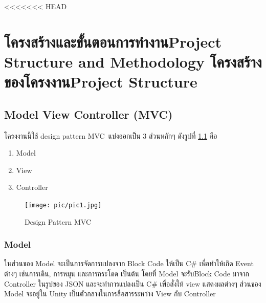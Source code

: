 <<<<<<< HEAD
\chapter{\ifproject%
\ifcpe โครงสร้างและขั้นตอนการทำงาน\else Project Structure and Methodology\fi
\else%
\ifcpe โครงสร้างของโครงงาน\else Project Structure\fi
\fi
}


\makeatletter


\makeatother

\section{Model View Controller (MVC)}
โครงงานนี้ใช้ design pattern MVC~\cite{mvc}แบ่งออกเป็น 3 ส่วนหลักๆ ดังรูปที่ \ref{mvc} คือ 
\begin{enumerate}
    \item Model
    \item View
    \item Controller
\end{enumerate}

\begin{figure}
\begin{center}
\texttt{[image: pic/pic1.jpg]}
\end{center}
\caption[Poem]{Design Pattern MVC}
\label{mvc}
\end{figure}

\subsection{Model}
 ในส่วนของ Model จะเป็นการจัดการแปลงจาก Block Code ให้เป็น C\# เพื่อทำให้เกิด Event ต่างๆ เช่นการเดิน, การหมุน
 และการกระโดด เป็นต้น โดยที่ Model จะรับBlock Code มาจาก Controller ในรูปของ JSON
 และจะทำการแปลงเป็น C\# เพื่อสั่งให้ view แสดงผลต่างๆ ส่วนของ Model จะอยู่ใน Unity
 เป็นตัวกลางในการสื่อสารระหว่าง View กับ Controller

